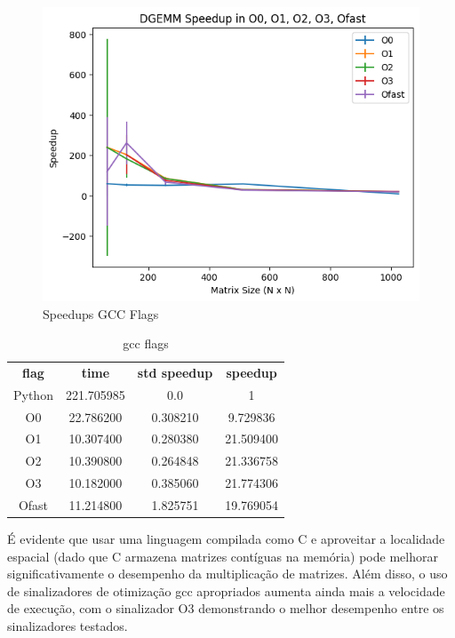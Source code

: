 \documentclass[12pt]{article}
\begin{document}
\begin{figure}[h]
    \centering
    \includegraphics[scale=0.75]{figures/speedups_gcc.png}
    \caption{Speedups GCC Flags}
    \label{fig:speedups-gcc-flags}
\end{figure}

\begin{table}[h]
    \centering
    \label{tab:gcc-flags}
    \begin{tabular}{cccc}
        \textbf{flag} & \textbf{time} & \textbf{std speedup} & \textbf{speedup} \\
        Python & 221.705985 & 0.0 & 1\\
        O0 &	 22.786200   &	0.308210  &	9.729836 \\
        O1 & 10.307400 & 0.280380 & 21.509400 \\
        O2 & 10.390800 & 0.264848 & 21.336758 \\
        O3 & 10.182000 & 0.385060 & 21.774306 \\
        Ofast & 11.214800 & 1.825751 & 19.769054 \\
    \end{tabular}
    \caption{gcc flags}
\end{table}

É evidente que usar uma linguagem compilada como C e aproveitar a localidade espacial (dado que C armazena matrizes contíguas na memória) pode melhorar significativamente o desempenho da multiplicação de matrizes. Além disso, o uso de sinalizadores de otimização gcc apropriados aumenta ainda mais a velocidade de execução, com o sinalizador O3 demonstrando o melhor desempenho entre os sinalizadores testados.
\end{document}

